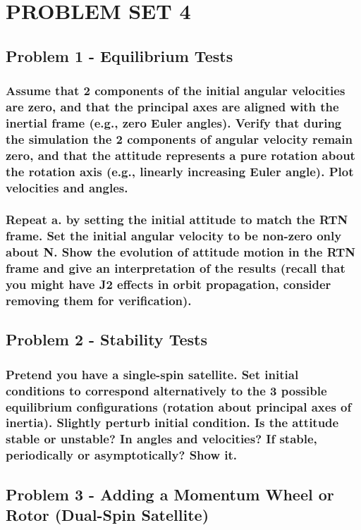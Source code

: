 \section{\Large PROBLEM SET 4}

\subsection{Problem 1 - Equilibrium Tests}

\subsubsection{Assume that 2 components of the initial angular velocities are zero, and that the principal axes are
aligned with the inertial frame (e.g., zero Euler angles). Verify that during the simulation the 2
components of angular velocity remain zero, and that the attitude represents a pure rotation about
the rotation axis (e.g., linearly increasing Euler angle). Plot velocities and angles.}

\subsubsection{Repeat a. by setting the initial attitude to match the RTN frame. Set the initial angular velocity to
be non-zero only about N. Show the evolution of attitude motion in the RTN frame and give an
interpretation of the results (recall that you might have J2 effects in orbit propagation, consider
removing them for verification).}

\subsection{Problem 2 - Stability Tests}

\subsubsection{Pretend you have a single-spin satellite. Set initial conditions to correspond alternatively to the 3
possible equilibrium configurations (rotation about principal axes of inertia). Slightly perturb initial
condition. Is the attitude stable or unstable? In angles and velocities? If stable, periodically or
asymptotically? Show it.}

\subsection{Problem 3 - Adding a Momentum Wheel or Rotor (Dual-Spin Satellite)}


